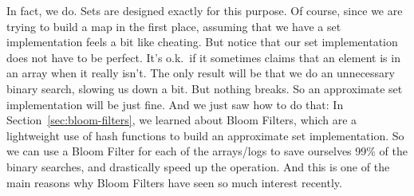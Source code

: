 In fact, we do. Sets are designed exactly for this purpose. Of course,
since we are trying to build a map in the first place, assuming that
we have a set implementation feels a bit like cheating.
But notice that our set implementation does not have to be perfect.
It's o.k.~if it sometimes claims that an element is in an array when
it really isn't. The only result will be that we do an unnecessary
binary search, slowing us down a bit. But nothing breaks.
So an approximate set implementation will be just fine.
And we just saw how to do that: In Section~\ref{sec:bloom-filters}, we
learned about Bloom Filters, which are a lightweight use of hash
functions to build an approximate set implementation.
So we can use a Bloom Filter for each of the arrays/logs to save
ourselves 99\% of the binary searches, and drastically speed up the
 operation. And this is one of the main reasons why Bloom
Filters have seen so much interest recently.
